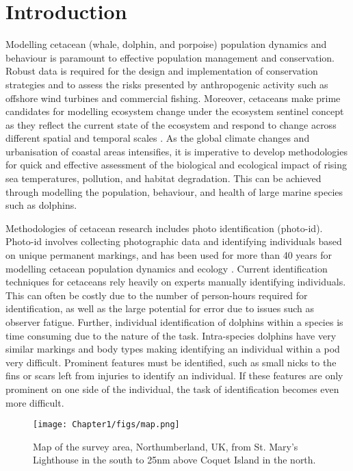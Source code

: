 \chapter{Introduction}

Modelling cetacean (whale, dolphin, and porpoise) population dynamics and behaviour is paramount to effective population management and conservation. Robust data is required for the design and implementation of conservation strategies and to assess the risks presented by anthropogenic activity such as offshore wind turbines and commercial fishing. Moreover, cetaceans make prime candidates for modelling ecosystem change under the ecosystem sentinel concept as they reflect the current state of the ecosystem and respond to change across different spatial and temporal scales \cite{moore_marine_2008}. As the global climate changes and urbanisation of coastal areas intensifies, it is imperative to develop methodologies for quick and effective assessment of the biological and ecological impact of rising sea temperatures, pollution, and habitat degradation. This can be achieved through modelling the population, behaviour, and health of large marine species such as dolphins.

Methodologies of cetacean research includes photo identification (photo-id). Photo-id involves collecting photographic data and identifying individuals based on unique permanent markings, and has been used for more than 40 years for modelling cetacean population dynamics and ecology \cite{connor_male_2015, wursig_photographic_1977}. Current identification techniques for cetaceans rely heavily on experts manually identifying individuals. This can often be costly due to the number of person-hours required for identification, as well as the large potential for error due to issues such as observer fatigue. Further, individual identification of dolphins within a species is time consuming due to the nature of the task. Intra-species dolphins have very similar markings and body types making identifying an individual within a pod very difficult. Prominent features must be identified, such as small nicks to the fins or scars left from injuries to identify an individual. If these features are only prominent on one side of the individual, the task of identification becomes even more difficult.

\begin{figure}[H]
	\begin{center}
		\texttt{[image: Chapter1/figs/map.png]}
	\end{center}
	\caption{Map of the survey area, Northumberland, UK, from St. Mary's Lighthouse in the south to 25nm above Coquet Island in the north.}
	\label{fig:map}
\end{figure}

